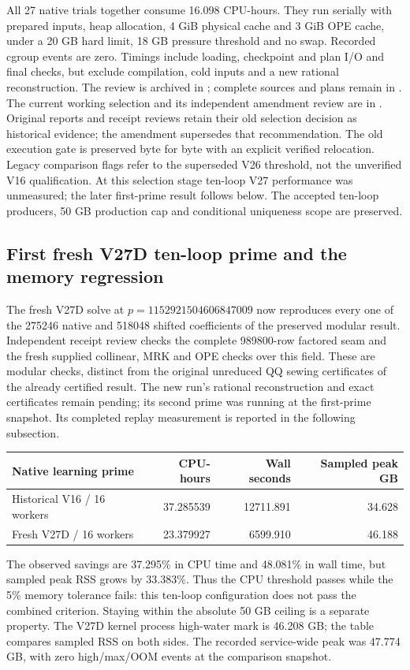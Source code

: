 \documentclass[11pt]{article}
\begin{document}
All 27 native trials together consume 16.098 CPU-hours. They run serially
with prepared inputs, heap allocation, 4 GiB physical cache and 3 GiB OPE
cache, under a 20 GB hard limit, 18 GB pressure threshold and no swap.
Recorded cgroup events are zero. Timings include loading, checkpoint and
plan I/O and final checks, but exclude compilation, cold inputs and a new
rational reconstruction. The review is archived in
; complete sources and plans remain in
. The current working selection and its
independent amendment review are in .
Original reports and receipt reviews retain their old selection decision as
historical evidence; the amendment supersedes that recommendation. The old
execution gate is preserved byte for byte with an explicit verified
relocation. Legacy comparison flags refer to the superseded V26 threshold,
not the unverified V16 qualification. At this selection stage ten-loop V27
performance was unmeasured; the later first-prime result follows below.
The accepted ten-loop producers, 50 GB production cap and
conditional uniqueness scope are preserved.

\subsection{First fresh V27D ten-loop prime and the memory regression}
The fresh V27D solve at $p=1152921504606847009$ now reproduces every one
of the 275246 native and 518048 shifted coefficients of the preserved
modular result. Independent receipt review checks the complete 989800-row
factored seam and the fresh supplied collinear, MRK and OPE checks over
this field. These are modular checks, distinct from the original unreduced
QQ sewing certificates of the already certified result. The new run's
rational reconstruction and exact certificates remain pending; its second
prime was running at the first-prime snapshot. Its completed replay
measurement is reported in the following subsection.

\begin{center}
\begin{tabular}{lrrr}\toprule
Native learning prime & CPU-hours & Wall seconds & Sampled peak GB\\\midrule
Historical V16 / 16 workers & 37.285539 & 12711.891 & 34.628\\
Fresh V27D / 16 workers & 23.379927 & 6599.910 & 46.188\\
\bottomrule
\end{tabular}
\end{center}
The observed savings are 37.295\% in CPU time and 48.081\% in wall time,
but sampled peak RSS grows by 33.383\%. Thus the CPU threshold passes
while the 5\% memory tolerance fails: this ten-loop configuration does not
pass the combined criterion. Staying within the absolute 50 GB ceiling
is a separate property. The V27D kernel process high-water mark is
46.208 GB; the table compares sampled RSS on both sides. The recorded
service-wide peak was 47.774 GB, with zero high/max/OOM events at the
comparison snapshot.
\end{document}
